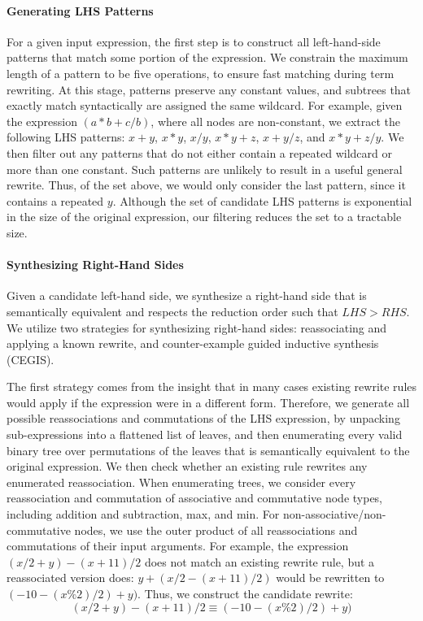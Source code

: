 \documentclass[acmsmall,review,anonymous]{acmart}\settopmatter{printfolios=true,printccs=false,printacmref=false}
\begin{document}
\paragraph{Generating LHS Patterns} For a given input expression, the first step
is to construct all left-hand-side patterns that match some portion of the expression.
We constrain the maximum length of a pattern to be five operations, to ensure fast matching
during term rewriting. At this stage, patterns preserve any constant values, and subtrees
that exactly match syntactically are assigned the same wildcard. For
example, given the expression $(a*b + c/b)$, where all nodes are non-constant,
we extract the following LHS patterns: $x + y$, $x * y$, $x / y$, $x * y + z$,
$x + y/z$, and $x*y + z/y$.  We then filter out any patterns that do not either contain
a repeated wildcard or more than one constant. Such patterns are unlikely to result in a useful general
rewrite.  Thus, of the set above, we would only consider the last pattern, since
it contains a repeated $y$.  Although the set of candidate LHS patterns is exponential
in the size of the original expression, our filtering reduces the set to a tractable
size.

\paragraph{Synthesizing Right-Hand Sides} Given a candidate left-hand side, we 
synthesize a right-hand side that is semantically equivalent and respects the reduction
order such that $\mathit{LHS} > \mathit{RHS}$.  We utilize two strategies for synthesizing
right-hand sides: reassociating and applying a known rewrite, and counter-example guided
inductive synthesis (CEGIS).

The first strategy comes from the insight that in many cases existing rewrite rules would apply
if the expression were in a different form.  Therefore, we generate all possible
reassociations and commutations of the LHS expression, by unpacking sub-expressions
into a flattened list of leaves, and then enumerating every valid binary
tree over permutations of the leaves that is semantically equivalent to the original
expression.  We then check whether an existing rule rewrites any enumerated reassociation.
When enumerating trees, we consider every reassociation and commutation
of associative and commutative node types, including addition and subtraction, max, and
min.  For non-associative/non-commutative nodes, we use the outer product of all reassociations
and commutations of their input arguments.  For example, the expression $(x/2 + y) - (x + 11)/2$
does not match an existing rewrite rule, but a reassociated version does: $y + (x/2 - (x + 11)/2)$
would be rewritten to $(-10 - (x \% 2)/2) + y)$.  Thus, we construct the candidate rewrite:
$$(x/2 + y) - (x + 11)/2 \equiv (-10 - (x \% 2)/2) + y)$$
\end{document}
